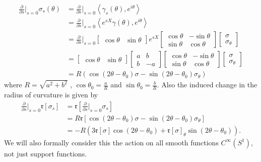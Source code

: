 \documentclass[12pt,a4paper]{article}
\begin{document}
\begin{align*}
   \frac{\partial}{\partial s} \bigg|_{s=0} \sigma_{s}(\theta) & = \frac{\partial}{\partial s}\bigg|_{s=0} \left< \gamma_{s}(\theta), e^{i \theta}  \right> \\
   & = \frac{\partial}{\partial s}\bigg|_{s=0} \left< e^{sX}\gamma(\theta), e^{i \theta}  \right> \\
   & = \frac{\partial}{\partial s}\bigg|_{s=0} \begin{bmatrix}
      \cos \theta & \sin \theta
   \end{bmatrix}e^{sX} \begin{bmatrix}
      \cos \theta & - \sin \theta \\
      \sin \theta & \cos \theta
   \end{bmatrix} \begin{bmatrix}
      \sigma \\
      \sigma_{\theta}
   \end{bmatrix}\\
   & = \begin{bmatrix}
      \cos \theta & \sin \theta
   \end{bmatrix} \begin{bmatrix}
      a & b \\
      b & -a
   \end{bmatrix} \begin{bmatrix}
      \cos \theta & - \sin \theta \\
      \sin \theta & \cos \theta
   \end{bmatrix} \begin{bmatrix}
      \sigma \\
      \sigma_{\theta}
   \end{bmatrix} \\
   & = R \left( \cos(2 \theta - \theta_{0})\sigma - \sin(2 \theta - \theta_{0})\sigma_{\theta} \right)
\end{align*}
where $ R = \sqrt{a^{2}+b^{2}} $ , $ \cos\theta_{0} = \frac{a}{R} $ and $ \sin \theta_{0} = \frac{b}{R} $. Also the induced change in the radius of curvature is given by \begin{align*}
   \frac{\partial}{\partial s}\bigg|_{s=0} \mathfrak{r}[\sigma_{s}] & = \mathfrak{r}\left[\frac{\partial}{\partial s}\bigg|_{s=0} \sigma_{s}\right] \\
   & = R\mathfrak{r} [\cos(2 \theta - \theta_{0})\sigma - \sin(2 \theta - \theta_{0})\sigma_{\theta}] \\
   & = - R (3 \mathfrak{r}[\sigma]\cos(2 \theta-\theta_{0})+ \mathfrak{r}[\sigma]_{\theta}\sin(2 \theta-\theta_{0})).
\end{align*}
We will also formally consider this the action on all smooth functions $ C^{\infty}(S^{1}) $, not just support functions. 
\end{document}
